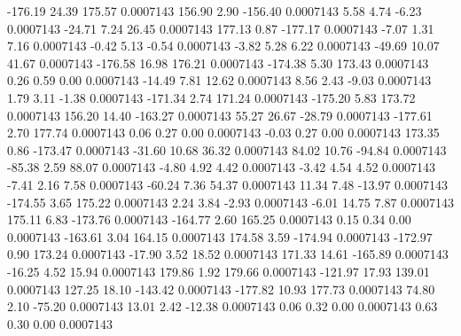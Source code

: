      -176.19       24.39      175.57     0.0007143
      156.90        2.90     -156.40     0.0007143
        5.58        4.74       -6.23     0.0007143
      -24.71        7.24       26.45     0.0007143
      177.13        0.87     -177.17     0.0007143
       -7.07        1.31        7.16     0.0007143
       -0.42        5.13       -0.54     0.0007143
       -3.82        5.28        6.22     0.0007143
      -49.69       10.07       41.67     0.0007143
     -176.58       16.98      176.21     0.0007143
     -174.38        5.30      173.43     0.0007143
        0.26        0.59        0.00     0.0007143
      -14.49        7.81       12.62     0.0007143
        8.56        2.43       -9.03     0.0007143
        1.79        3.11       -1.38     0.0007143
     -171.34        2.74      171.24     0.0007143
     -175.20        5.83      173.72     0.0007143
      156.20       14.40     -163.27     0.0007143
       55.27       26.67      -28.79     0.0007143
     -177.61        2.70      177.74     0.0007143
        0.06        0.27        0.00     0.0007143
       -0.03        0.27        0.00     0.0007143
      173.35        0.86     -173.47     0.0007143
      -31.60       10.68       36.32     0.0007143
       84.02       10.76      -94.84     0.0007143
      -85.38        2.59       88.07     0.0007143
       -4.80        4.92        4.42     0.0007143
       -3.42        4.54        4.52     0.0007143
       -7.41        2.16        7.58     0.0007143
      -60.24        7.36       54.37     0.0007143
       11.34        7.48      -13.97     0.0007143
     -174.55        3.65      175.22     0.0007143
        2.24        3.84       -2.93     0.0007143
       -6.01       14.75        7.87     0.0007143
      175.11        6.83     -173.76     0.0007143
     -164.77        2.60      165.25     0.0007143
        0.15        0.34        0.00     0.0007143
     -163.61        3.04      164.15     0.0007143
      174.58        3.59     -174.94     0.0007143
     -172.97        0.90      173.24     0.0007143
      -17.90        3.52       18.52     0.0007143
      171.33       14.61     -165.89     0.0007143
      -16.25        4.52       15.94     0.0007143
      179.86        1.92      179.66     0.0007143
     -121.97       17.93      139.01     0.0007143
      127.25       18.10     -143.42     0.0007143
     -177.82       10.93      177.73     0.0007143
       74.80        2.10      -75.20     0.0007143
       13.01        2.42      -12.38     0.0007143
        0.06        0.32        0.00     0.0007143
        0.63        0.30        0.00     0.0007143
